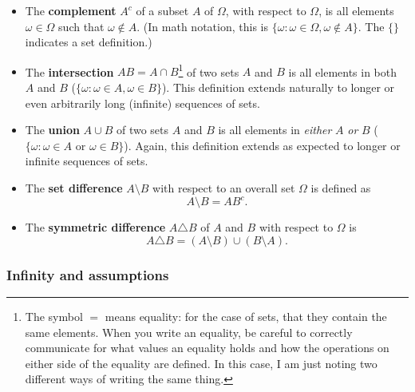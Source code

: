 \documentclass[12pt]{article}
\begin{document}
\begin{itemize}
\item The \textbf{complement} $A^c$ of a subset $A$ of $\Omega$, with respect to $\Omega$, is all elements $\omega \in \Omega$ such that $\omega \notin A$. (In math notation, this is $\{ \omega : \omega \in \Omega, \omega \notin A \}$. The $\{ \}$ indicates a set definition.)
\item The \textbf{intersection} $AB = A \cap B$\footnote{The symbol $=$ means equality: for the case of sets, that they contain the same elements. When you write an equality, be careful to correctly communicate for what values an equality holds and how the operations on either side of the equality are defined. In this case, I am just noting two different ways of writing the same thing.} of two sets $A$ and $B$ is all elements in both $A$ and $B$ ($\{ \omega : \omega \in A, \omega \in B \}$). This definition extends naturally to longer or even arbitrarily long (infinite) sequences of sets.
\item The \textbf{union} $A \cup B$ of two sets $A$ and $B$ is all elements in \emph{either} $A$ \emph{or} $B$ ($\{ \omega : \omega \in A \text{ or } \omega \in B \}$). Again, this definition extends as expected to longer or infinite sequences of sets.
\item The \textbf{set difference} $A \setminus B$ with respect to an overall set $\Omega$ is defined as
\[ A \setminus B = AB^c. \]
\item The \textbf{symmetric difference} $A \triangle B$ of $A$ and $B$ with respect to $\Omega$ is
\[ A \triangle B = (A \setminus B) \cup (B \setminus A). \]
\end{itemize}


\subsubsection{Infinity and assumptions}
\end{document}
